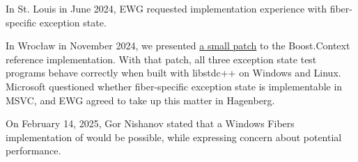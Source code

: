 In St. Louis in June 2024, EWG requested\cite{stlouisnotes} implementation
experience with fiber-specific exception state.

In Wrocław in November 2024,\cite{wroclawnotes} we presented
\href{https://github.com/secondlife/3p-boost/blob/nat/exstate/patches/libs/context/0001-switch-exception-state.patch}{a small patch}
to the Boost.Context reference implementation. With that patch, all three
exception state test programs behave correctly when built with libstdc++ on
Windows and Linux. Microsoft questioned whether fiber-specific exception state
is implementable in MSVC, and EWG agreed to take up this matter in Hagenberg.

On February 14, 2025, Gor Nishanov stated\cite{onwindows} that a Windows
Fibers implementation of \fiber would be possible, while expressing concern
about potential performance.


